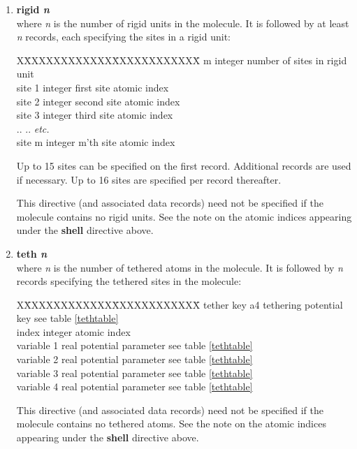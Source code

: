 \begin{enumerate}
\begin{table}[ht]
\begin{centering}
\end{centering}
\end{table}

\item{\bf rigid {\em n}}\\
where {\em n} is the number of rigid units in the molecule. It is 
followed by at least {\em n} records, each specifying the sites in a rigid
unit:
\begin{tabbing}
X\=XXXXXXXXXXXX\=XXXXXXXXXXXX\=\kill
\> m \> integer \> number of sites in rigid unit\\
\> site 1 \> integer \> first site atomic index\\
\> site 2 \> integer \> second site atomic  index\\
\> site 3 \> integer \> third site atomic index\\
\> .. \> .. \> {\em etc.}\\
\> site m \> integer \> m'th site atomic index\\
\end{tabbing}
Up to 15 sites can be specified on the first record. Additional records
are used if necessary. Up to 16 sites are specified per record thereafter.

This directive (and associated data records) need not be specified if
the molecule contains no rigid units.
See the note on the atomic indices appearing under the {\bf shell}
directive above.

\item{\bf teth {\em n}}\\
where {\em n} is the number of tethered atoms in the molecule. It is 
followed by {\em n} records specifying the tethered sites in the molecule:
\begin{tabbing}
X\=XXXXXXXXXXXX\=XXXXXXXXXXXX\=\kill
\> tether key \> a4 \> tethering potential key  see table \ref{tethtable}\\
\> index \> integer \> atomic index \\
\> variable 1 \> real \> potential parameter see table
\ref{tethtable}\\
\> variable 2 \> real \> potential parameter see table
\ref{tethtable}\\
\> variable 3 \> real \> potential parameter see table
\ref{tethtable}\\
\> variable 4 \> real \> potential parameter see table
\ref{tethtable}\\
\end{tabbing}
This directive (and associated data records) need not be specified if
the molecule contains no tethered atoms.
See the note on the atomic indices appearing under the {\bf shell}
directive above.
 

\end{enumerate}
